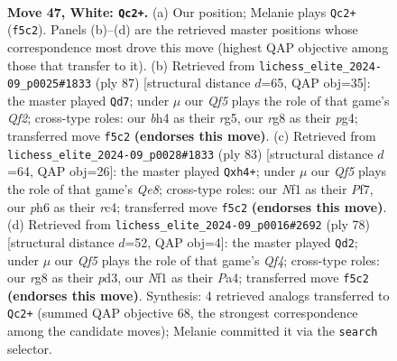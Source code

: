 \documentclass[11pt]{article}
\begin{document}
\clearpage

\begin{figure}[p]\centering
\begin{subfigure}{0.46\textwidth}\centering
\resizebox{\linewidth}{!}{%
\newchessgame
\chessboard[
  setfen={r5r1/p5p1/2k4p/3p1Q1P/pq1P2Pb/4P3/6K1/5N2 w - - 2 47},
  showmover=false,
  pgfstyle=straightmove, color=movearrow, markmove={f5-c2}
]}
\caption{}
\end{subfigure}\hfill
\begin{subfigure}{0.46\textwidth}\centering
\resizebox{\linewidth}{!}{%
\newchessgame
\chessboard[
  setfen={5k2/1pp2q2/p2p4/P2P2R1/1P4P1/2PQ4/6K1/4R3 b - - 0 44},
  showmover=false,
  pgfstyle=straightmove, color=movearrow, markmove={f7-d7}
]}
\caption{}
\end{subfigure}
\\[4pt]
\begin{subfigure}{0.46\textwidth}\centering
\resizebox{\linewidth}{!}{%
\newchessgame
\chessboard[
  setfen={2Q5/5pk1/6p1/7p/1PR4P/P4P2/6PK/3rq3 b - - 0 42},
  showmover=false,
  pgfstyle=straightmove, color=movearrow, markmove={e1-h4}
]}
\caption{}
\end{subfigure}\hfill
\begin{subfigure}{0.46\textwidth}\centering
\resizebox{\linewidth}{!}{%
\newchessgame
\chessboard[
  setfen={8/p3r3/8/1P1kr2p/P4QpP/3p2P1/6P1/6K1 w - - 2 40},
  showmover=false,
  pgfstyle=straightmove, color=movearrow, markmove={f4-d2}
]}
\caption{}
\end{subfigure}
\caption{\textbf{Move 47, White: \texttt{Qc2+}.} (a) Our position; Melanie plays \texttt{Qc2+} (\texttt{f5c2}). Panels (b)--(d) are the retrieved master positions whose correspondence most drove this move (highest QAP objective among those that transfer to it). (b) Retrieved from \texttt{lichess\_elite\_2024-09\_p0025\#1833} (ply 87) [structural distance $d$=65, QAP obj=35]: the master played \texttt{Qd7}; under $\mu$ our \emph{Qf5} plays the role of that game's \emph{Qf2}; cross-type roles: our \emph{b}h4 as their \emph{r}g5, our \emph{r}g8 as their \emph{p}g4; transferred move \texttt{f5c2} \textbf{(endorses this move)}. (c) Retrieved from \texttt{lichess\_elite\_2024-09\_p0028\#1833} (ply 83) [structural distance $d$=64, QAP obj=26]: the master played \texttt{Qxh4+}; under $\mu$ our \emph{Qf5} plays the role of that game's \emph{Qe8}; cross-type roles: our \emph{N}f1 as their \emph{P}f7, our \emph{p}h6 as their \emph{r}c4; transferred move \texttt{f5c2} \textbf{(endorses this move)}. (d) Retrieved from \texttt{lichess\_elite\_2024-09\_p0016\#2692} (ply 78) [structural distance $d$=52, QAP obj=4]: the master played \texttt{Qd2}; under $\mu$ our \emph{Qf5} plays the role of that game's \emph{Qf4}; cross-type roles: our \emph{r}g8 as their \emph{p}d3, our \emph{N}f1 as their \emph{P}a4; transferred move \texttt{f5c2} \textbf{(endorses this move)}. Synthesis: 4 retrieved analogs transferred to \texttt{Qc2+} (summed QAP objective 68, the strongest correspondence among the candidate moves); Melanie committed it via the \texttt{search} selector.}
\label{fig:thought-m92}
\end{figure}
\end{document}
